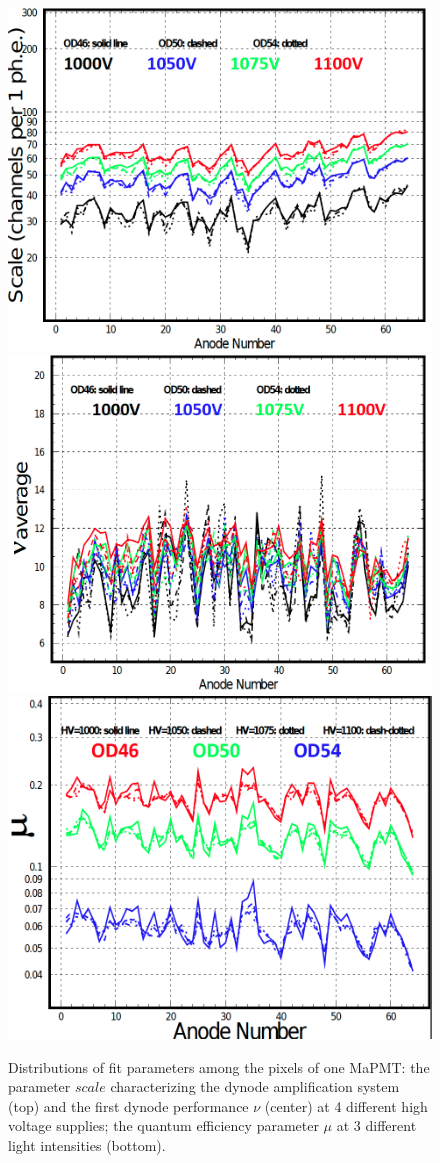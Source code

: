 \documentclass[5p,times,twocolumn]{elsarticle}
\begin{document}
\begin{figure}[h]
\begin{center}
	\includegraphics[width=0.85\linewidth]{Pavel_pass1.png}
	\includegraphics[width=0.85\linewidth]{Pavel_pass2.png}
	\includegraphics[width=0.85\linewidth]{Pavel_pass3.png}
	\caption{Distributions of fit parameters among the pixels of one MaPMT: the parameter $scale$ characterizing
          the dynode amplification system (top) and the first dynode performance $\nu$ (center) at 4 different high
          voltage supplies; the quantum efficiency parameter $\mu$ at 3 different light intensities (bottom).}
	\label{fig:PavelPassport}
\end{center}
\end{figure}
\end{document}
